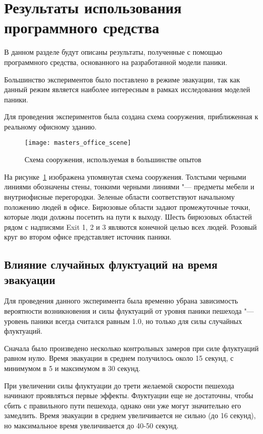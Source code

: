 \section{Результаты использования программного средства}
\label{sec:results}

В данном разделе будут описаны результаты, полученные с помощью программного средства,
основанного на разработанной модели паники.

Большинство экспериментов было поставлено в режиме эвакуации, так как данный режим
является наиболее интересным в рамках исследования моделей паники.

Для проведения экспериментов была создана схема сооружения, приближенная к реальному офисному зданию.

\begin{figure}[ht!]
  \centering
  \texttt{[image: masters\_office\_scene]}
  \caption{Схема сооружения, используемая в большинстве опытов}
  \label{sec:results:office_scene}
\end{figure}

На рисунке~\ref{sec:results:office_scene} изображена упомянутая схема сооружения.
Толстыми черными линиями обозначены стены, тонкими черными линиями "--- предметы мебели и внутриофисные перегородки.
Зеленые области соответствуют начальному положению людей в офисе.
Бирюзовые области задают промежуточные точки, которые люди должны посетить на пути к выходу.
Шесть бирюзовых областей рядом с надписями Exit 1, 2 и 3 являются конечной целью всех людей.
Розовый круг во втором офисе представляет источник паники.

\subsection{Влияние случайных флуктуаций на время эвакуации}
\label{sec:results:fluctuation}

Для проведения данного эксперимента была временно убрана зависимость вероятности возникновения и силы флуктуаций от уровня паники пешехода "---
уровень паники всегда считался равным 1.0, но только для силы случайных флуктуаций.

Сначала было произведено несколько контрольных замеров при силе флуктуаций равном нулю.
Время эвакуации в среднем получилось около 15 секунд, с минимумом в 5 и максимумом в 30 секунд.

При увеличении силы флуктуации до трети желаемой скорости пешехода начинают проявляться первые эффекты.
Флуктуации еще не достаточны, чтобы сбить с правильного пути пешехода, однако они уже могут значительно его замедлить.
Время эвакуации в среднем увеличивается не сильно (до 16 секунд), но максимальное время увеличивается до 40-50 секунд.

